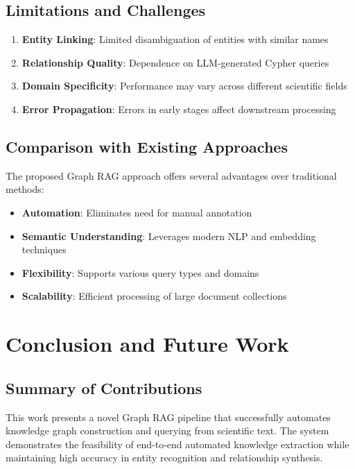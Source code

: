 \documentclass[conference]{IEEEtran}
\begin{document}
\subsection{Limitations and Challenges}
\begin{enumerate}
\item \textbf{Entity Linking}: Limited disambiguation of entities with similar names
\item \textbf{Relationship Quality}: Dependence on LLM-generated Cypher queries
\item \textbf{Domain Specificity}: Performance may vary across different scientific fields
\item \textbf{Error Propagation}: Errors in early stages affect downstream processing
\end{enumerate}

\subsection{Comparison with Existing Approaches}
The proposed Graph RAG approach offers several advantages over traditional methods:
\begin{itemize}
\item \textbf{Automation}: Eliminates need for manual annotation
\item \textbf{Semantic Understanding}: Leverages modern NLP and embedding techniques
\item \textbf{Flexibility}: Supports various query types and domains
\item \textbf{Scalability}: Efficient processing of large document collections
\end{itemize}

\section{Conclusion and Future Work}

\subsection{Summary of Contributions}
This work presents a novel Graph RAG pipeline that successfully automates knowledge graph construction and querying from scientific text. The system demonstrates the feasibility of end-to-end automated knowledge extraction while maintaining high accuracy in entity recognition and relationship synthesis.
\end{document}
